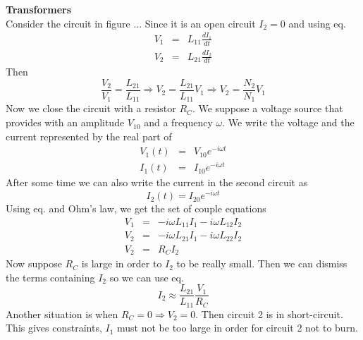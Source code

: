 \documentclass[12pt,a4paper]{article}
\newcommand{\dt}[1]{\frac{d #1}{dt}} %
\begin{document}
\textbf{Transformers}\\
Consider the circuit in figure ... Since it is an open circuit $I_2 = 0$ and using eq.
\begin{eqnarray}
	V_1 & = & L_{11}\dt{I_1} \\
	V_2 & = & L_{21}\dt{I_2}
\end{eqnarray}
Then
\begin{equation}
	\frac{V_2}{V_1} = \frac{L_{21}}{L_{11}} \Rightarrow V_2 = \frac{L_{21}}{L_{11}} V_1 \Rightarrow V_2 = \frac{N_{2}}{N_{1}} V_1
\end{equation}
Now we close the circuit with a resistor $R_C$. We suppose a voltage source that provides with an amplitude $V_{10}$ and a frequency $\omega$. We write the voltage and the current represented by the real part of
\begin{eqnarray}
	V_1(t) & = & V_{10}e^{-i\omega t} \\
	I_1(t) & = & I_{10}e^{-i\omega t}
\end{eqnarray}
After some time we can also write the current in the second circuit as
\begin{equation}
	I_2(t)  =  I_{20}e^{-i\omega t}
\end{equation}
Using eq. and Ohm's law, we get the set of couple equations
\begin{eqnarray}
	V_1 & = & -i\omega L_{11}I_1 -i\omega L_{12}I_2 \\
	V_2 & = & -i\omega L_{21}I_1 -i\omega L_{22}I_2 \\
	V_2 & = & R_C I_2
\end{eqnarray}
Now suppose $R_C$ is large in order to $I_2$ to be really small. Then we can dismiss the terms containing $I_2$ so we can use eq.
\begin{equation}
	I_2 \approx \frac{L_{21}}{L_{11}} \frac{V_1}{R_C}
\end{equation}
Another situation is when $R_C = 0 \Rightarrow V_2 = 0$. Then circuit 2 is in short-circuit. This gives constraints, $I_1$ must not be too large in order for  circuit 2 not to burn.
\end{document}
